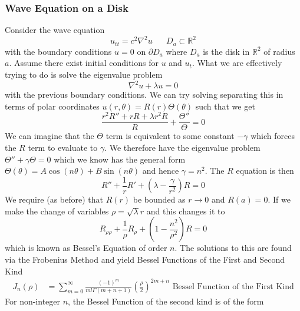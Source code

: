 \documentclass{article}
\newcommand{\R}{\mathbb{R}}
\newcommand{\twen}{\hspace{20pt}}
\newcommand{\lap}{\nabla ^2}
\theoremstyle{definition}
\begin{document}
\subsubsection{Wave Equation on a Disk}
Consider the wave equation 
\begin{equation*}
    u_{tt} = c^2 \lap u \twen D_a \subset \R^2
\end{equation*}
with the boundary conditions $u=0$ on $\partial D_a$ where $D_a$ is the disk in $\R^2$ of radius $a$. Assume there exist initial conditions for $u$ and $u_t$. What we are effectively trying to do is solve the eigenvalue problem 
\begin{equation*}
    \lap u + \lambda u =0
\end{equation*}
with the previous boundary conditions. We can try solving separating this in terms of polar coordinates $u(r,\theta) = R(r) \Theta(\theta)$ such that we get 
\begin{equation*}
    \frac{r^2R'' +rR + \lambda r^2R}{R} + \frac{\Theta ''}{\Theta} = 0
\end{equation*}
We can imagine that the $\Theta$ term is equivalent to some constant $-\gamma$ which forces the $R$ term to evaluate to $\gamma$. We therefore have the eigenvalue problem $\Theta''+\gamma \Theta =0$ which we know has the general form $\Theta ( \theta ) = A\cos(n\theta) +B\sin (n\theta)$ and hence $\gamma = n^2$. The $R$ equation is then 
\begin{equation*}
    R'' + \frac{1}{r}R'+ \left( \lambda - \frac{\gamma}{r^2}\right)R = 0
\end{equation*}
We require (as before) that $R(r)$ be bounded as $r\to 0$ and $R(a)=0$. If we make the change of variables $\rho = \sqrt{\lambda}r$ and this changes it to 
\begin{equation*}
    R_{\rho \rho} + \frac{1}{\rho}R_\rho + \left( 1 - \frac{n^2}{\rho^2} \right) R = 0
\end{equation*}
which is known as Bessel's Equation of order $n$. The solutions to this are found via the Frobenius Method and yield Bessel Functions of the First and Second Kind 
\begin{equation*}
    \begin{split}
        J_n(\rho) &= \sum^\infty_{m=0} \frac{(-1)^m}{m! \Gamma (m+n+1)} \left( \frac{\rho}{2} \right)^{2m+n} \text{ Bessel Function of the First Kind} 
    \end{split}
\end{equation*}
For non-integer $n$, the Bessel Function of the second kind is of the form 
\end{document}

